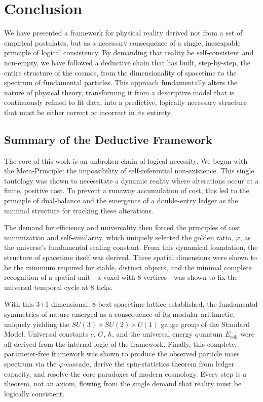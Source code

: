 \documentclass[11pt,a4paper]{article}
\begin{document}
\section{Conclusion}

We have presented a framework for physical reality derived not from a set of empirical postulates, but as a necessary consequence of a single, inescapable principle of logical consistency. By demanding that reality be self-consistent and non-empty, we have followed a deductive chain that has built, step-by-step, the entire structure of the cosmos, from the dimensionality of spacetime to the spectrum of fundamental particles. This approach fundamentally alters the nature of physical theory, transforming it from a descriptive model that is continuously refined to fit data, into a predictive, logically necessary structure that must be either correct or incorrect in its entirety.

\subsection{Summary of the Deductive Framework}
The core of this work is an unbroken chain of logical necessity. We began with the Meta-Principle: the impossibility of self-referential non-existence. This single tautology was shown to necessitate a dynamic reality where alterations occur at a finite, positive cost. To prevent a runaway accumulation of cost, this led to the principle of dual-balance and the emergence of a double-entry ledger as the minimal structure for tracking these alterations.

The demand for efficiency and universality then forced the principles of cost minimization and self-similarity, which uniquely selected the golden ratio, \(\varphi\), as the universe's fundamental scaling constant. From this dynamical foundation, the structure of spacetime itself was derived. Three spatial dimensions were shown to be the minimum required for stable, distinct objects, and the minimal complete recognition of a spatial unit—a voxel with 8 vertices—was shown to fix the universal temporal cycle at 8 ticks.

With this 3+1 dimensional, 8-beat spacetime lattice established, the fundamental symmetries of nature emerged as a consequence of its modular arithmetic, uniquely yielding the \(SU(3) \times SU(2) \times U(1)\) gauge group of the Standard Model. Universal constants \(c\), \(G\), \(\hbar\), and the universal energy quantum \(E_{\text{coh}}\) were all derived from the internal logic of the framework. Finally, this complete, parameter-free framework was shown to produce the observed particle mass spectrum via the \(\varphi\)-cascade, derive the spin-statistics theorem from ledger capacity, and resolve the core paradoxes of modern cosmology. Every step is a theorem, not an axiom, flowing from the single demand that reality must be logically consistent.
\end{document}
